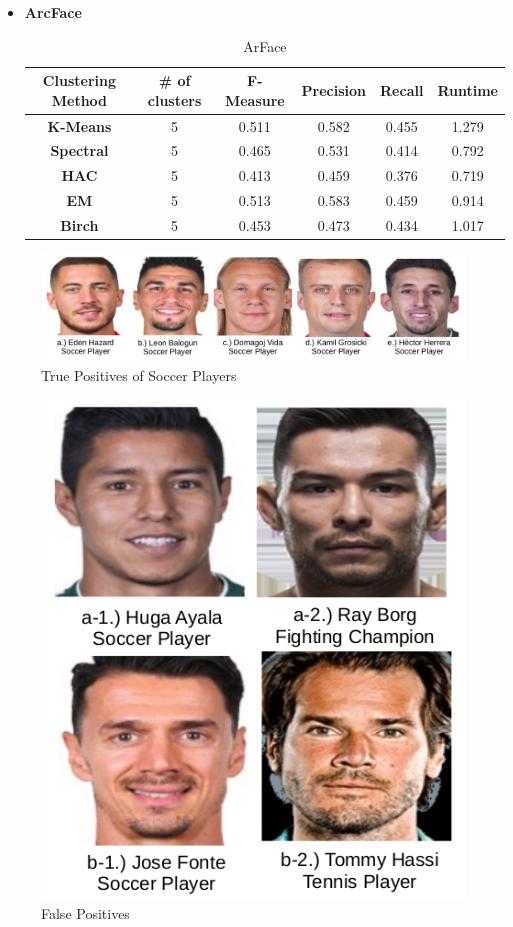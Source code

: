 \documentclass[12pt,english]{article}
\begin{document}
\begin{itemize}
\item \textbf{ArcFace}

\begin{table}[h!]
\centering
\begin{tabular}{||c c c c c c||} 
 \hline
 Clustering Method & \# of clusters & F-Measure & Precision & Recall & Runtime\\ [0.5ex]
 \hline\hline
 \textbf{K-Means} & 5 & 0.511 & 0.582 & 0.455 & 1.279\\ 
 \hline
  \textbf{Spectral} & 5 & 0.465 & 0.531 & 0.414 & 0.792\\
 \hline
 \textbf{HAC} & 5 & 0.413 & 0.459 & 0.376 & 0.719\\
 \hline
 \textbf{EM} & 5 & 0.513 & 0.583 & 0.459 & 0.914\\
 \hline
 \textbf{Birch} & 5 & 0.453 & 0.473 & 0.434 & 1.017\\
 \hline
\end{tabular}
\caption{ArFace}
\label{table:4}
\end{table}

\end{itemize}


\begin{figure}[!tbp]
 \centering
    \includegraphics[width=\columnwidth]{figures/soccer_tp.png}
    \caption{True Positives of Soccer Players}
    \label{fig:ex1tp}
\end{figure}

\begin{figure}[!tbp]
 \centering
    \includegraphics[width=0.4\columnwidth]{figures/soccer_fp.png}
    \caption{False Positives}
    \label{fig:ex1fp}
\end{figure}
\end{document}
